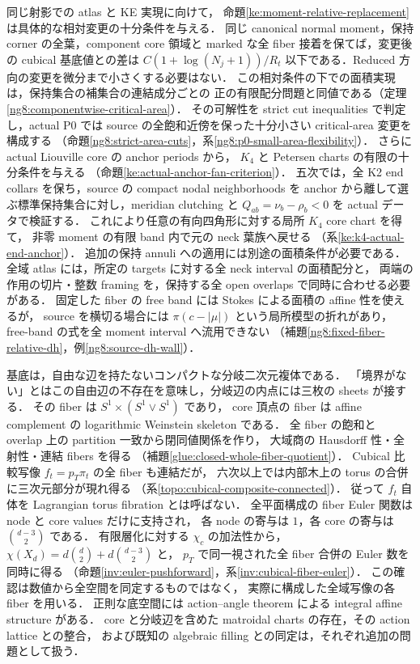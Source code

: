 同じ射影での atlas と KE 実現に向けて，
命題\ref{ke:moment-relative-replacement}は具体的な相対変更の十分条件を与える．
同じ canonical normal moment，保持 corner の全葉，component core 領域と
marked な全 fiber 接着を保てば，変更後の cubical 基底値との差は
$C(1+\log(N_j+1))/R_t$ 以下である．Reduced 方向の変更を微分まで小さくする必要はない．
この相対条件の下での面積実現は，保持集合の補集合の連結成分ごとの
正の有限配分問題と同値である（定理\ref{ng8:componentwise-critical-area}）．
その可解性を strict cut inequalities で判定し，actual P0 では
source の全飽和近傍を保った十分小さい critical-area 変更を構成する
（命題\ref{ng8:strict-area-cuts}，系\ref{ng8:p0-small-area-flexibility}）．
さらに actual Liouville core の anchor periods から，
$K_4$ と Petersen charts の有限の十分条件を与える
（命題\ref{ke:actual-anchor-fan-criterion}）．
五次では，全 K2 end collars を保ち，source の compact nodal neighborhoods を
anchor から離して選ぶ標準保持集合に対し，meridian clutching と
$Q_{ab}=\nu_b-\rho_b<0$ を actual データで検証する．
これにより任意の有向四角形に対する局所 $K_4$ core chart を得て，
非零 moment の有限 band 内で元の neck 葉族へ戻せる
（系\ref{ke:k4-actual-end-anchor}）．
追加の保持 annuli への適用には別途の面積条件が必要である．
全域 atlas には，所定の targets に対する全 neck interval の面積配分と，
両端の作用の切片・整数 framing を，保持する全 open overlaps で同時に合わせる必要がある．
固定した fiber の free band には Stokes による面積の affine 性を使えるが，
source を横切る場合には $\pi(c-|\mu|)$ という局所模型の折れがあり，
free-band の式を全 moment interval へ流用できない
（補題\ref{ng8:fixed-fiber-relative-dh}，例\ref{ng8:source-dh-wall}）．

基底は，自由な辺を持たないコンパクトな分岐二次元複体である．
「境界がない」とはこの自由辺の不存在を意味し，分岐辺の内点には三枚の sheets が接する．
その fiber は $S^1\times(S^1\vee S^1)$ であり，
core 頂点の fiber は affine complement の logarithmic Weinstein skeleton である．
全 fiber の飽和と overlap 上の partition 一致から閉同値関係を作り，
大域商の Hausdorff 性・全射性・連結 fibers を得る
（補題\ref{glue:closed-whole-fiber-quotient}）．
Cubical 比較写像 $f_t=p_T\pi_t$ の全 fiber も連結だが，
六次以上では内部木上の torus の合併に三次元部分が現れ得る
（系\ref{topo:cubical-composite-connected}）．
従って $f_t$ 自体を Lagrangian torus fibration とは呼ばない．
全平面構成の fiber Euler 関数は node と core values だけに支持され，
各 node の寄与は $1$，各 core の寄与は $\binom{d-3}{2}$ である．
有限層化に対する $\chi_c$ の加法性から，
$\chi(X_d)=d\binom d2+d\binom{d-3}{2}$ と，
$p_T$ で同一視された全 fiber 合併の Euler 数を同時に得る
（命題\ref{inv:euler-pushforward}，系\ref{inv:cubical-fiber-euler}）．
この確認は数値から全空間を同定するものではなく，
実際に構成した全域写像の各 fiber を用いる．
正則な底空間には action--angle theorem による integral affine structure がある．
core と分岐辺を含めた matroidal charts の存在，その action lattice との整合，
および既知の algebraic filling との同定は，それぞれ追加の問題として扱う．

